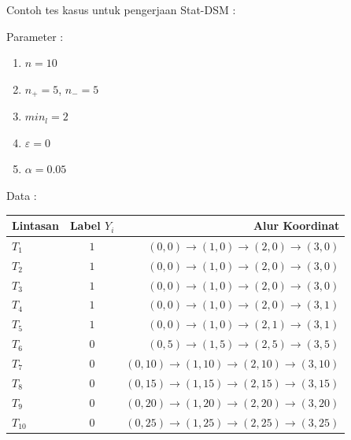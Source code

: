 \documentclass[a4paper,twoside]{article}
\begin{document}
Contoh tes kasus untuk pengerjaan Stat-DSM :

Parameter :
\begin{enumerate}
	\item $n = 10$
	\item $n_+ = 5$, $n_- = 5$
	\item $min_l = 2$
	\item $\varepsilon = 0$
	\item $\alpha = 0.05$
\end{enumerate}

Data :
\begin{tabular} {l|c|r}
	\textbf{Lintasan} & \textbf{Label $Y_i$} & \textbf{Alur Koordinat} \\
	\toprule
	$T_1$ & $1$ & $(0,0)\rightarrow(1,0)\rightarrow(2,0)\rightarrow(3,0)$ \\
	$T_2$ & $1$ & $(0,0)\rightarrow(1,0)\rightarrow(2,0)\rightarrow(3,0)$ \\
	$T_3$ & $1$ & $(0,0)\rightarrow(1,0)\rightarrow(2,0)\rightarrow(3,0)$ \\
	$T_4$ & $1$ & $(0,0)\rightarrow(1,0)\rightarrow(2,0)\rightarrow(3,1)$ \\
	$T_5$ & $1$ & $(0,0)\rightarrow(1,0)\rightarrow(2,1)\rightarrow(3,1)$ \\
	$T_6$ & $0$ & $(0,5)\rightarrow(1,5)\rightarrow(2,5)\rightarrow(3,5)$ \\
	$T_7$ & $0$ & $(0,10)\rightarrow(1,10)\rightarrow(2,10)\rightarrow(3,10)$ \\
	$T_8$ & $0$ & $(0,15)\rightarrow(1,15)\rightarrow(2,15)\rightarrow(3,15)$ \\
	$T_9$ & $0$ & $(0,20)\rightarrow(1,20)\rightarrow(2,20)\rightarrow(3,20)$ \\
	$T_{10}$ &$0$ & $(0,25)\rightarrow(1,25)\rightarrow(2,25)\rightarrow(3,25)$ \\
\end{tabular}
\end{document}
